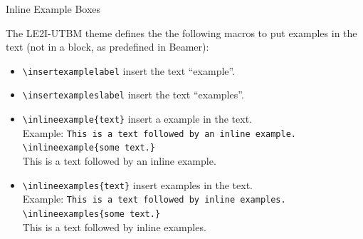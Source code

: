 \documentclass[english,sectioncirclenumberstyle]{le2iutbmbeamer}
\begin{document}
\begin{frame}{Inline Example Boxes}
	\begin{small}
	The LE2I-UTBM theme defines the the following macros to put examples in the text (not in a block, as predefined in Beamer):
	\begin{itemize}
	\item \texttt{{\textbackslash}insertexamplelabel} insert the text ``example''.
	\item \texttt{{\textbackslash}insertexampleslabel} insert the text ``examples''.
	\vspace{1em}
	\item \texttt{{\textbackslash}inlineexample\{text\}} insert a example in the text. \\
		Example: \texttt{This is a text followed by an inline example. {\textbackslash}inlineexample\{some text.\}} \\
		This is a text followed by an inline example. 
	\item \texttt{{\textbackslash}inlineexamples\{text\}} insert examples in the text. \\
		Example: \texttt{This is a text followed by inline examples. {\textbackslash}inlineexamples\{some text.\}} \\
		This is a text followed by inline examples. 
	\end{itemize}
	\end{small}
\end{frame}
\end{document}
